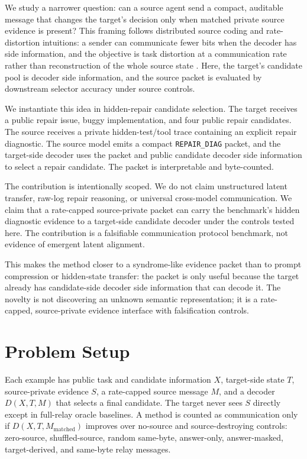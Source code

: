 \documentclass{article}
\newcommand{\diag}{\texttt{REPAIR\_DIAG}}
\begin{document}
We study a narrower question: can a source agent send a compact, auditable
message that changes the target's decision only when matched private source
evidence is present? This framing follows distributed source coding and
rate-distortion intuitions: a sender can communicate fewer bits when the decoder
has side information, and the objective is task distortion at a communication
rate rather than reconstruction of the whole source state
\citep{slepian1973noiseless,wyner1976rate,shannon1959coding}. Here, the
target's candidate pool is decoder side information, and the source packet is
evaluated by downstream selector accuracy under source controls.

We instantiate this idea in hidden-repair candidate selection. The target
receives a public repair issue, buggy implementation, and four public repair
candidates. The source receives a private hidden-test/tool trace containing an
explicit repair diagnostic. The source model emits a compact \diag{} packet,
and the target-side decoder uses the packet and public candidate decoder side
information to select a repair candidate. The packet is interpretable and
byte-counted.

The contribution is intentionally scoped. We do not claim unstructured latent
transfer, raw-log repair reasoning, or universal cross-model communication. We
claim that a rate-capped source-private packet can carry the benchmark's hidden
diagnostic evidence to a target-side candidate decoder under the controls
tested here.
The contribution is a falsifiable communication protocol benchmark, not
evidence of emergent latent alignment.

This makes the method closer to a syndrome-like evidence packet than to prompt
compression or hidden-state transfer: the packet is only useful because the
target already has candidate-side decoder side information that can decode it.
The novelty is not discovering an unknown semantic representation; it is a
rate-capped, source-private evidence interface with falsification controls.

\section{Problem Setup}

Each example has public task and candidate information $X$, target-side state
$T$, source-private evidence $S$, a rate-capped source message $M$, and a
decoder $D(X,T,M)$ that selects a final candidate. The target never sees $S$
directly except in full-relay oracle baselines. A method is counted as
communication only if $D(X,T,M_{\mathrm{matched}})$ improves over no-source and
source-destroying controls:
zero-source, shuffled-source, random same-byte, answer-only, answer-masked,
target-derived, and same-byte relay messages.
\end{document}
